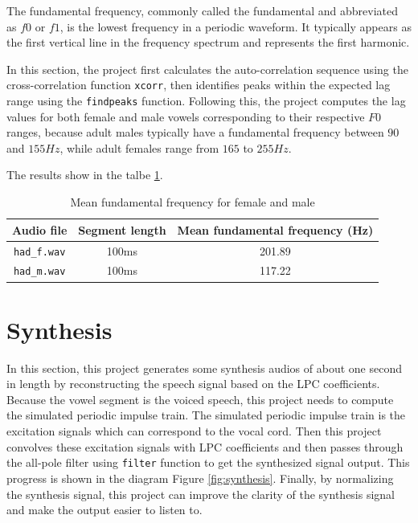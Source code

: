 \documentclass{article}
\begin{document}
The fundamental frequency, commonly called the fundamental and abbreviated as $f0$ or $f1$, is the lowest frequency in a periodic waveform. It typically appears as the first vertical line in the frequency spectrum and represents the first harmonic.

In this section, the project first calculates the auto-correlation sequence using the cross-correlation function \verb+xcorr+, then identifies peaks within the expected lag range using the \verb+findpeaks+ function. Following this, the project computes the lag values for both female and male vowels corresponding to their respective $F0$ ranges, because adult males typically have a fundamental frequency between $90$ and $155 Hz$, while adult females range from $165$ to $255 Hz$\citep{baken2000clinical}.

The results show in the talbe \ref{table:mean-fundamental-frequency}.

\begin{table}[h]
\caption{Mean fundamental frequency for female and male} %
\centering %
\begin{tabular}{c c c} %
\hline\hline %
Audio file & Segment length & Mean fundamental frequency (Hz) \\ [0.5ex] %
\hline %
\verb+had_f.wav+ & 100ms & 201.89 \\ %
\verb+had_m.wav+ & 100ms & 117.22 \\ [1ex] %
\hline %
\end{tabular}
\label{table:mean-fundamental-frequency}
\end{table}

\section{Synthesis}

In this section, this project generates some synthesis audios of about one second in length by reconstructing the speech signal based on the LPC coefficients. Because the vowel segment is the voiced speech, this project needs to compute the simulated periodic impulse train. The simulated periodic impulse train is the excitation signals which can correspond to the vocal cord. Then this project convolves these excitation signals with LPC coefficients and then passes through the all-pole filter using \verb+filter+ function to get the synthesized signal output\citep{EEEM030}. This progress is shown in the diagram Figure \ref{fig:synthesis}. Finally, by normalizing the synthesis signal, this project can improve the clarity of the synthesis signal and make the output easier to listen to.
\end{document}
